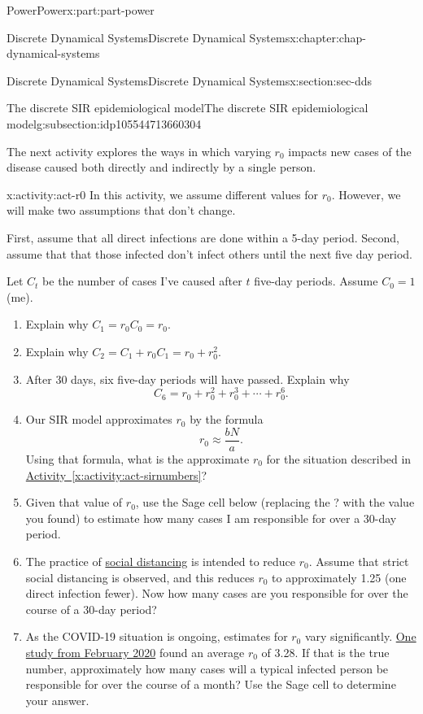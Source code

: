 \documentclass[oneside,10pt,]{book}
\newcommand{\xreffont}{\relax}
\numberwithin{equation}{section}
\begin{document}
\begin{partptx}{Power}{}{Power}{}{}{x:part:part-power}
\begin{chapterptx}{Discrete Dynamical Systems}{}{Discrete Dynamical Systems}{}{}{x:chapter:chap-dynamical-systems}
\begin{sectionptx}{Discrete Dynamical Systems}{}{Discrete Dynamical Systems}{}{}{x:section:sec-dds}
\begin{subsectionptx}{The discrete SIR epidemiological model}{}{The discrete SIR epidemiological model}{}{}{g:subsection:idp105544713660304}
\par
The next activity explores the ways in which varying \(r_0\) impacts new cases of the disease caused both directly and indirectly by a single person.%
\begin{activity}{}{x:activity:act-r0}%
In this activity, we assume different values for \(r_0\). However, we will make two assumptions that don't change.%
\par
First, assume that all direct infections are done within a 5-day period. Second, assume that that those infected don't infect others until the next five day period.%
\par
Let \(C_t\) be the number of cases I've caused after \(t\) five-day periods. Assume \(C_0 = 1\) (me).%
%
\begin{enumerate}
\item{}Explain why \(C_1 = r_0 C_0 = r_0\).%
\item{}Explain why \(C_2 = C_1 + r_0 C_1 = r_0 + r_0^2\).%
\item{}After 30 days, six five-day periods will have passed. Explain why%
\begin{equation*}
C_6 = r_0 + r_0^2 + r_0^3 + \cdots + r_0^6.
\end{equation*}
%
\item{}Our SIR model approximates \(r_0\) by the formula%
\begin{equation}
r_0 \approx \frac{bN}{a}.\label{x:men:eq-r0}
\end{equation}
Using that formula, what is the approximate \(r_0\) for the situation described in \hyperref[x:activity:act-sirnumbers]{Activity~{\xreffont\ref{x:activity:act-sirnumbers}}}?%
\item{}Given that value of \(r_0\), use the Sage cell below (replacing the ? with the value you found) to estimate how many cases I am responsible for over a 30-day period.%
\item{}The practice of \href{https://en.wikipedia.org/wiki/Social_distancing}{social distancing}\footnotemark{} is intended to reduce \(r_0\). Assume that strict social distancing is observed, and this reduces \(r_0\) to approximately 1.25 (one direct infection fewer). Now how many cases are you responsible for over the course of a 30-day period?%
\item{}As the COVID-19 situation is ongoing, estimates for \(r_0\) vary significantly. \href{https://academic.oup.com/jtm/article/27/2/taaa021/5735319}{One study from February 2020}\footnotemark{} found an average \(r_0\) of 3.28. If that is the true number, approximately how many cases will a typical infected person be responsible for over the course of a month? Use the Sage cell to determine your answer.%

\end{enumerate}
\end{activity}
\end{subsectionptx}
\end{sectionptx}
\end{chapterptx}
\end{partptx}
\end{document}

